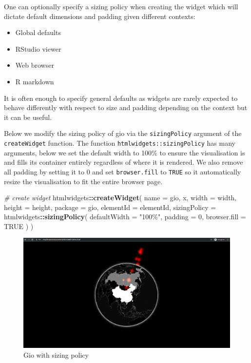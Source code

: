 \documentclass[
]{krantz}
\makeatletter
\newenvironment{Shaded}{\begin{snugshade}}{\end{snugshade}}
\newcommand{\CommentTok}[1]{\textcolor[rgb]{0.37,0.37,0.37}{\textit{#1}}}
\newcommand{\DataTypeTok}[1]{\textcolor[rgb]{0.27,0.27,0.27}{#1}}
\newcommand{\DecValTok}[1]{\textcolor[rgb]{0.06,0.06,0.06}{#1}}
\newcommand{\KeywordTok}[1]{\textcolor[rgb]{0.27,0.27,0.27}{\textbf{#1}}}
\newcommand{\NormalTok}[1]{#1}
\newcommand{\OperatorTok}[1]{\textcolor[rgb]{0.43,0.43,0.43}{\textbf{#1}}}
\newcommand{\OtherTok}[1]{\textcolor[rgb]{0.37,0.37,0.37}{#1}}
\newcommand{\StringTok}[1]{\textcolor[rgb]{0.5,0.5,0.5}{#1}}
\providecommand{\tightlist}{%
  \setlength{\itemsep}{0pt}\setlength{\parskip}{0pt}}
\newenvironment{kframe}{%
\medskip{}
\setlength{\fboxsep}{.8em}
 \def\at@end@of@kframe{}%
 \ifinner\ifhmode%
  \def\at@end@of@kframe{\end{minipage}}%
  \begin{minipage}{\columnwidth}%
 \fi\fi%
 \def\FrameCommand##1{\hskip\@totalleftmargin \hskip-\fboxsep
 \colorbox{shadecolor}{##1}\hskip-\fboxsep
     \hskip-\linewidth \hskip-\@totalleftmargin \hskip\columnwidth}%
 \MakeFramed {\advance\hsize-\width
   \@totalleftmargin\z@ \linewidth\hsize
   \@setminipage}}%
 {\par\unskip\endMakeFramed%
 \at@end@of@kframe}
\renewenvironment{Shaded}{\begin{kframe}}{\end{kframe}}
\makeatother
\begin{document}
One can optionally specify a sizing policy when creating the widget which will dictate default dimensions and padding given different contexts:

\begin{itemize}
\tightlist
\item
  Global defaults
\item
  RStudio viewer
\item
  Web browser
\item
  R markdown
\end{itemize}

It is often enough to specify general defaults as widgets are rarely expected to behave differently with respect to size and padding depending on the context but it can be useful.

Below we modify the sizing policy of gio via the \texttt{sizingPolicy} argument of the \texttt{createWidget} function. The function \texttt{htmlwidgets::sizingPolicy} has many arguments, below we set the default width to 100\% to ensure the visualisation is and fills its container entirely regardless of where it is rendered. We also remove all padding by setting it to 0 and set \texttt{browser.fill} to \texttt{TRUE} so it automatically resize the visualisation to fit the entire browser page.

\begin{Shaded}
\begin{Highlighting}[]
\CommentTok{\# create widget}
\NormalTok{htmlwidgets}\OperatorTok{::}\KeywordTok{createWidget}\NormalTok{(}
  \DataTypeTok{name =} \StringTok{\textquotesingle{}gio\textquotesingle{}}\NormalTok{,}
\NormalTok{  x,}
  \DataTypeTok{width =}\NormalTok{ width,}
  \DataTypeTok{height =}\NormalTok{ height,}
  \DataTypeTok{package =} \StringTok{\textquotesingle{}gio\textquotesingle{}}\NormalTok{,}
  \DataTypeTok{elementId =}\NormalTok{ elementId,}
  \DataTypeTok{sizingPolicy =}\NormalTok{ htmlwidgets}\OperatorTok{::}\KeywordTok{sizingPolicy}\NormalTok{(}
    \DataTypeTok{defaultWidth =} \StringTok{"100\%"}\NormalTok{,}
    \DataTypeTok{padding =} \DecValTok{0}\NormalTok{,}
    \DataTypeTok{browser.fill =} \OtherTok{TRUE}
\NormalTok{  )}
\NormalTok{)}
\end{Highlighting}
\end{Shaded}

\begin{figure}
\centering
\includegraphics{images/gio-fit.png}
\caption{Gio with sizing policy}
\end{figure}
\end{document}
